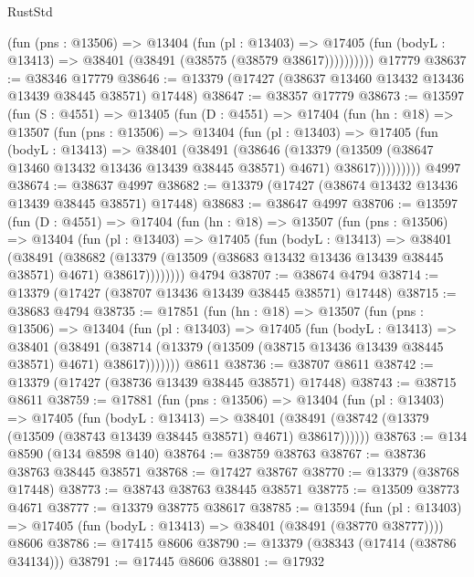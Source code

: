 \begin{lexlean}{RustStd}
\begin{coremodule}
            (fun (pns : @13506) =>
            @13404
              (fun (pl : @13403) =>
              @17405 (fun (bodyL : @13413) => @38401 (@38491 (@38575 (@38579 @38617))))))))))
    @17779
@38637 := @38346 @17779
@38646 := @13379 (@17427 (@38637 @13460 @13432 @13436 @13439 @38445 @38571) @17448)
@38647 := @38357 @17779
@38673 := @13597
    (fun (S : @4551) =>
    @13405
      (fun (D : @4551) =>
      @17404
        (fun (hn : @18) =>
        @13507
          (fun (pns : @13506) =>
          @13404
            (fun (pl : @13403) =>
            @17405
              (fun (bodyL : @13413) =>
              @38401
                (@38491
                  (@38646
                    (@13379
                      (@13509 (@38647 @13460 @13432 @13436 @13439 @38445 @38571) @4671)
                      @38617)))))))))
    @4997
@38674 := @38637 @4997
@38682 := @13379 (@17427 (@38674 @13432 @13436 @13439 @38445 @38571) @17448)
@38683 := @38647 @4997
@38706 := @13597
    (fun (D : @4551) =>
    @17404
      (fun (hn : @18) =>
      @13507
        (fun (pns : @13506) =>
        @13404
          (fun (pl : @13403) =>
          @17405
            (fun (bodyL : @13413) =>
            @38401
              (@38491
                (@38682
                  (@13379 (@13509 (@38683 @13432 @13436 @13439 @38445 @38571) @4671) @38617))))))))
    @4794
@38707 := @38674 @4794
@38714 := @13379 (@17427 (@38707 @13436 @13439 @38445 @38571) @17448)
@38715 := @38683 @4794
@38735 := @17851
    (fun (hn : @18) =>
    @13507
      (fun (pns : @13506) =>
      @13404
        (fun (pl : @13403) =>
        @17405
          (fun (bodyL : @13413) =>
          @38401
            (@38491
              (@38714 (@13379 (@13509 (@38715 @13436 @13439 @38445 @38571) @4671) @38617)))))))
    @8611
@38736 := @38707 @8611
@38742 := @13379 (@17427 (@38736 @13439 @38445 @38571) @17448)
@38743 := @38715 @8611
@38759 := @17881
    (fun (pns : @13506) =>
    @13404
      (fun (pl : @13403) =>
      @17405
        (fun (bodyL : @13413) =>
        @38401 (@38491 (@38742 (@13379 (@13509 (@38743 @13439 @38445 @38571) @4671) @38617))))))
@38763 := @134 @8590 (@134 @8598 @140)
@38764 := @38759 @38763
@38767 := @38736 @38763 @38445 @38571
@38768 := @17427 @38767
@38770 := @13379 (@38768 @17448)
@38773 := @38743 @38763 @38445 @38571
@38775 := @13509 @38773 @4671
@38777 := @13379 @38775 @38617
@38785 := @13594
    (fun (pl : @13403) => @17405 (fun (bodyL : @13413) => @38401 (@38491 (@38770 @38777))))
    @8606
@38786 := @17415 @8606
@38790 := @13379 (@38343 (@17414 (@38786 @34134)))
@38791 := @17445 @8606
@38801 := @17932

\end{coremodule}
\end{lexlean}
